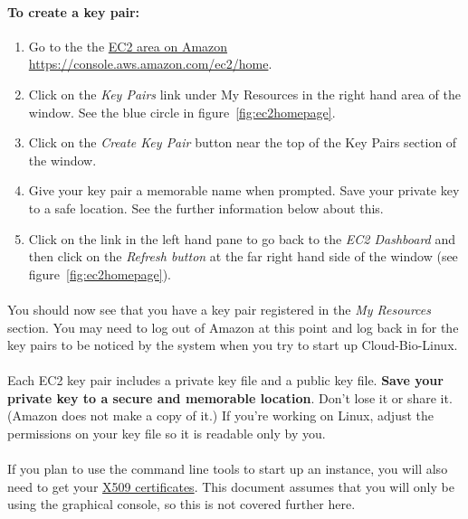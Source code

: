 \paragraph{To create a key pair:}
\begin{enumerate}
\item Go to the the \href{https://console.aws.amazon.com/ec2/home}{EC2 area on Amazon https://console.aws.amazon.com/ec2/home}.
\item Click on the \emph{Key Pairs} link under My Resources in the right hand area of the window. See the blue circle in figure~\ref{fig:ec2homepage}.
\item Click on the \emph{Create Key Pair} button near the top of the Key Pairs section of the window.
\item Give your key pair a memorable name when prompted. Save your private key to a safe location. See the further information below about this. 
\item Click on the link in the left hand pane to go back to the \emph{EC2 Dashboard} and then click on the \emph{Refresh button} at the far right hand side of the window (see figure~\ref{fig:ec2homepage}). 
\end{enumerate}

\paragraph{}You should now see that you have a key pair registered in the \emph{My Resources} section. 
You may need to log out of Amazon at this point and log back in for the key pairs to be noticed by the system when you try to start up Cloud-Bio-Linux. 


\paragraph{}Each EC2 key pair includes a private key file and a public key file. \textbf{Save your private key to a secure and memorable location}. Don't lose it or share it. (Amazon does not make a copy of it.) If you're working on Linux, adjust the permissions on your key file so it is readable only by you. 

\paragraph{}If you plan to use the command line tools to start up an instance, you will also need to get your \href{http://docs.amazonwebservices.com/AWSSecurityCredentials/1.0/AboutAWSCredentials.html#X509Credentials}{X509 certificates}. This document assumes that you will only be using the graphical console, so this is not covered further here. 


